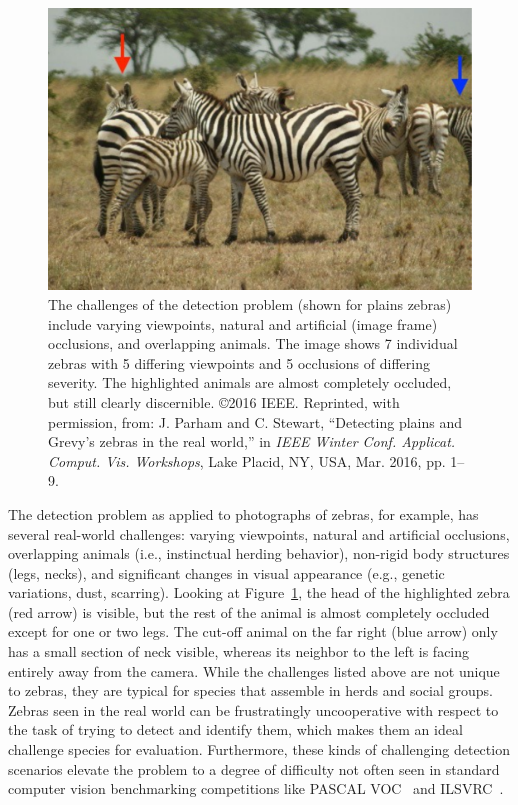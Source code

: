 \begin{figure}[!t]
    \begin{center}
        \includegraphics[width=0.80\linewidth]{resources/sample2-arrows.pdf}
    \end{center}
    \caption{The challenges of the detection problem (shown for plains zebras) include varying viewpoints, natural and artificial (image frame) occlusions, and overlapping animals.  The image shows 7 individual zebras with 5 differing viewpoints and 5 occlusions of differing severity.  The highlighted animals are almost completely occluded, but still clearly discernible.  \copyright 2016 IEEE. Reprinted, with permission, from: J. Parham and C. Stewart, ``Detecting plains and Grevy’s zebras in the real world,'' in \textit{IEEE Winter Conf. Applicat. Comput. Vis. Workshops}, Lake Placid, NY, USA, Mar. 2016, pp. 1–9.}
    \label{fig:challenge}
\end{figure}

The detection problem as applied to photographs of zebras, for example, has several real-world challenges: varying viewpoints, natural and artificial occlusions, overlapping animals (i.e., instinctual herding behavior), non-rigid body structures (legs, necks), and significant changes in visual appearance (e.g., genetic variations, dust, scarring).  Looking at Figure~\ref{fig:challenge}, the head of the highlighted zebra (red arrow) is visible, but the rest of the animal is almost completely occluded except for one or two legs.  The cut-off animal on the far right (blue arrow) only has a small section of neck visible, whereas its neighbor to the left is facing entirely away from the camera.  While the challenges listed above are not unique to zebras, they are typical for species that assemble in herds and social groups.  Zebras seen in the real world can be frustratingly uncooperative with respect to the task of trying to detect and identify them, which makes them an ideal challenge species for evaluation.  Furthermore, these kinds of challenging detection scenarios elevate the problem to a degree of difficulty not often seen in standard computer vision benchmarking competitions like PASCAL VOC~\cite{everingham_pascal_2010} and ILSVRC~\cite{russakovsky_imagenet_2015}.

